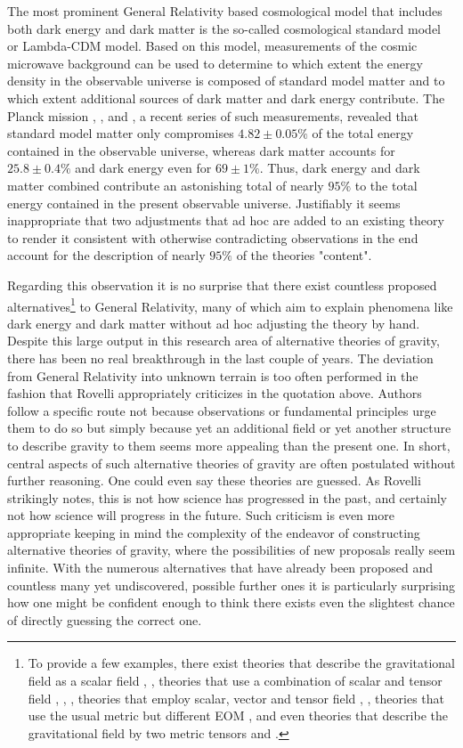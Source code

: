 The most prominent General Relativity based cosmological model that includes both dark energy and dark matter is the so-called cosmological standard model or Lambda-CDM model. Based on this model, measurements of the cosmic microwave background can be used to determine to which extent the energy density in the observable universe is composed of standard model matter and to which extent additional sources of dark matter and dark energy contribute. The Planck mission \cite{Planck13_1}, \cite{Planck13_2}, \cite{Planck15} and \cite{Planck18}, a recent series of such measurements, revealed that standard model matter only compromises $4.82\pm0.05\%$ of the total energy contained in the observable universe, whereas dark matter accounts for $ 25.8\pm0.4\%$ and dark energy even for $ 69 \pm 1 \%$. Thus, dark energy and dark matter combined contribute an astonishing total of nearly $95 \%$ to the total energy contained in the present observable universe.
Justifiably it seems inappropriate that two adjustments that ad hoc are added to an existing theory to render it consistent with otherwise contradicting observations in the end account for the description of nearly $95\%$ of the theories "content".  

Regarding this observation it is no surprise that there exist countless proposed alternatives\footnote{To provide a few examples, there exist theories that describe the gravitational field as a scalar field \cite{Scalar1}, \cite{Scalar2}, theories that use a combination of scalar and tensor field \cite{ST1}, \cite{ST2}, \cite{ST3}, theories that employ scalar, vector and tensor field \cite{SVT1}, \cite{SVT2}, theories that use the usual metric but different EOM \cite{fR1}, \cite{fR2} and even theories that describe the gravitational field by two metric tensors \cite{BIM1} and \cite{BIM2}.} to General Relativity, many of which aim to explain phenomena like dark energy and dark matter without ad hoc adjusting the theory by hand. 
Despite this large output in this research area of alternative theories of gravity, there has been no real breakthrough in the last couple of years. 
The deviation from General Relativity into unknown terrain is too often performed in the fashion that Rovelli appropriately criticizes in the quotation above. Authors follow a specific route not because observations or fundamental principles urge them to do so but simply because yet an additional field or yet another structure to describe gravity to them seems more appealing than the present one. In short, central aspects of such alternative theories of gravity are often postulated without further reasoning. One could even say these theories are guessed. As Rovelli strikingly notes, this is not how science has progressed in the past, and certainly not how science will progress in the future. Such criticism is even more appropriate keeping in mind the complexity of the endeavor of constructing alternative theories of gravity, where the possibilities of new proposals really seem infinite.
With the numerous alternatives that have already been proposed and countless many yet undiscovered, possible further ones it is particularly surprising how one might be confident enough to think there exists even the slightest chance of directly guessing the correct one. 

